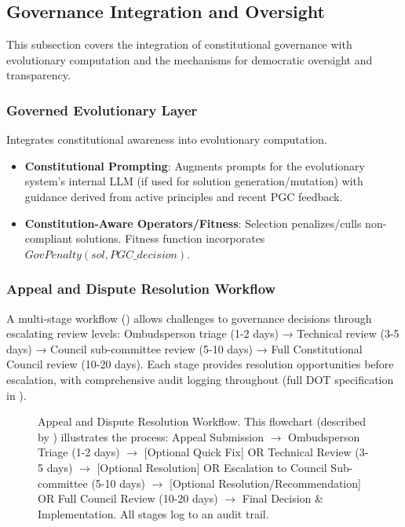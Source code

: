 \documentclass[sigconf,natbib]{acmart}
\begin{document}
\subsection{Governance Integration and Oversight}
\label{subsec:governance_integration}

This subsection covers the integration of constitutional governance with evolutionary computation and the mechanisms for democratic oversight and transparency.

\subsubsection{Governed Evolutionary Layer}
Integrates constitutional awareness into evolutionary computation.
\begin{itemize}
    \item \textbf{Constitutional Prompting}: Augments prompts for the evolutionary system's internal LLM (if used for solution generation/mutation) with guidance derived from active principles and recent PGC feedback.
    \item \textbf{Constitution-Aware Operators/Fitness}: Selection penalizes/culls non-compliant solutions. Fitness function incorporates $GovPenalty(sol, PGC\_decision)$.
\end{itemize}

\subsubsection{Appeal and Dispute Resolution Workflow}
A multi-stage workflow () allows challenges to governance decisions through escalating review levels: Ombudsperson triage (1-2 days) → Technical review (3-5 days) → Council sub-committee review (5-10 days) → Full Constitutional Council review (10-20 days). Each stage provides resolution opportunities before escalation, with comprehensive audit logging throughout (full DOT specification in ).

\begin{figure}[htbp]
  \centering
  \caption[Appeal and dispute resolution workflow diagram]{Appeal and Dispute Resolution Workflow. This flowchart (described by ) illustrates the process: Appeal Submission $\rightarrow$ Ombudsperson Triage (1-2 days) $\rightarrow$ [Optional Quick Fix] OR Technical Review (3-5 days) $\rightarrow$ [Optional Resolution] OR Escalation to Council Sub-committee (5-10 days) $\rightarrow$ [Optional Resolution/Recommendation] OR Full Council Review (10-20 days) $\rightarrow$ Final Decision \& Implementation. All stages log to an audit trail.}
  \label{fig:appeal_workflow}
\end{figure}
\end{document}
